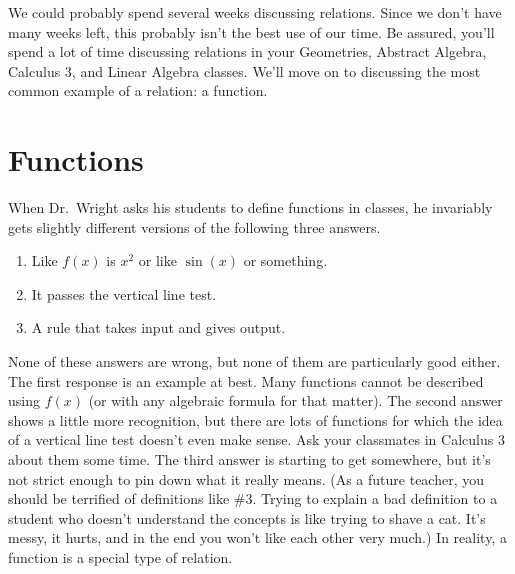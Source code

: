 We could probably spend several weeks discussing relations.  Since we don't have many weeks left, this probably isn't the best use of our time.  Be assured, you'll spend a lot of time discussing relations in your Geometries, Abstract Algebra, Calculus 3, and Linear Algebra classes.  We'll move on to discussing the most common example of a relation: a function.

\section{Functions}

When Dr.~Wright asks his students to define functions in classes, he invariably gets slightly different versions of the following three answers.
	\begin{enumerate}
	\item Like $f(x)$ is $x^2$ or like $\sin(x)$ or something.
	\item It passes the vertical line test.
	\item A rule that takes input and gives output.
	\end{enumerate}
	
None of these answers are wrong, but none of them are particularly good either.  The first response is an example at best.  Many functions cannot be described using $f(x)$ (or with any algebraic formula for that matter).  The second answer shows a little more recognition, but there are lots of functions for which the idea of a vertical line test doesn't even make sense.  Ask your classmates in Calculus 3 about them some time.  The third answer is starting to get somewhere, but it's not strict enough to pin down what it really means.  (As a future teacher, you should be terrified of definitions like \#3.  Trying to explain a bad definition to a student who doesn't understand the concepts is like trying to shave a cat.  It's messy, it hurts, and in the end you won't like each other very much.)  In reality, a function is a special type of relation.


